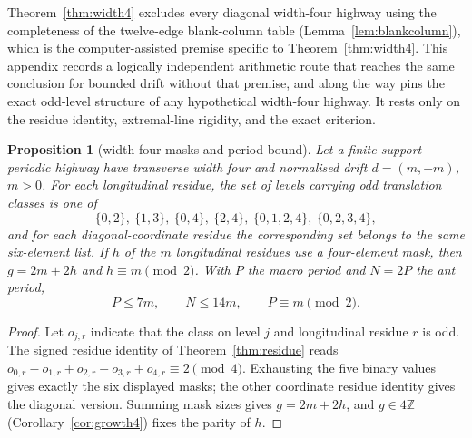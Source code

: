 \documentclass[11pt,letterpaper]{article}
\theoremstyle{plain}
\newtheorem{proposition}[theorem]{Proposition}
\theoremstyle{definition}
\newcommand{\Z}{\mathbb{Z}}
\newcommand{\drift}{d}
\newcommand{\growth}{g}
\begin{document}
\begin{NoHyper}
Theorem~\ref{thm:width4} excludes every diagonal width-four highway using the
completeness of the twelve-edge blank-column table (Lemma~\ref{lem:blankcolumn}),
which is the computer-assisted premise specific to Theorem~\ref{thm:width4}. This
appendix records a logically independent arithmetic route that reaches the same
conclusion for bounded drift without that premise, and along the way pins the exact
odd-level structure of any hypothetical width-four highway. It rests only on the
residue identity, extremal-line rigidity, and the exact criterion.

\begin{proposition}[width-four masks and period bound]\label{prop:width4arithmetic}
Let a finite-support periodic highway have transverse width four and normalised drift
$\drift=(m,-m)$, $m>0$. For each longitudinal residue, the set of levels carrying odd
translation classes is one of
\[
\{0,2\},\ \{1,3\},\ \{0,4\},\ \{2,4\},\ \{0,1,2,4\},\ \{0,2,3,4\},
\]
and for each diagonal-coordinate residue the corresponding set belongs to the same
six-element list. If $h$ of the $m$ longitudinal residues use a four-element mask,
then $\growth=2m+2h$ and $h\equiv m\pmod2$. With $P$ the macro period and $N=2P$ the
ant period,
\[
P\le 7m,\qquad N\le 14m,\qquad P\equiv m\pmod2.
\]
\end{proposition}

\begin{proof}
Let $o_{j,r}$ indicate that the class on level $j$ and longitudinal residue $r$ is
odd. The signed residue identity of Theorem~\ref{thm:residue} reads
$o_{0,r}-o_{1,r}+o_{2,r}-o_{3,r}+o_{4,r}\equiv2\pmod4$. Exhausting the five binary
values gives exactly the six displayed masks; the other coordinate residue identity
gives the diagonal version. Summing mask sizes gives $\growth=2m+2h$, and
$\growth\in4\Z$ (Corollary~\ref{cor:growth4}) fixes the parity of $h$.


\end{proof}
\end{NoHyper}
\end{document}
